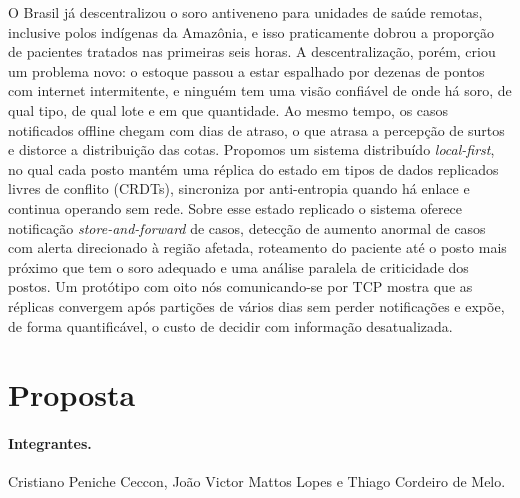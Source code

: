 \documentclass[a4paper,12pt]{article}
\begin{document}
\iniciarPreTextual
\fazcapa
\fazfolhaderosto

\begin{resumo}
  O Brasil já descentralizou o soro antiveneno para unidades de saúde
  remotas, inclusive polos indígenas da Amazônia, e isso praticamente dobrou
  a proporção de pacientes tratados nas primeiras seis horas. A
  descentralização, porém, criou um problema novo: o estoque passou a estar
  espalhado por dezenas de pontos com internet intermitente, e ninguém tem
  uma visão confiável de onde há soro, de qual tipo, de qual lote e em que
  quantidade. Ao mesmo tempo, os casos notificados offline chegam com dias de
  atraso, o que atrasa a percepção de surtos e distorce a distribuição das
  cotas. Propomos um sistema distribuído \emph{local-first}, no qual cada
  posto mantém uma réplica do estado em tipos de dados replicados livres de
  conflito (CRDTs), sincroniza por anti-entropia quando há enlace e continua
  operando sem rede. Sobre esse estado replicado o sistema oferece notificação
  \emph{store-and-forward} de casos, detecção de aumento anormal de casos com
  alerta direcionado à região afetada, roteamento do paciente até o posto mais
  próximo que tem o soro adequado e uma análise paralela de criticidade dos
  postos. Um protótipo com oito nós comunicando-se por TCP mostra que as
  réplicas convergem após partições de vários dias sem perder notificações e
  expõe, de forma quantificável, o custo de decidir com informação
  desatualizada.
\end{resumo}

\sumario

\iniciarTextual

\section{Proposta}
\label{sec:proposta}

\paragraph{Integrantes.} Cristiano Peniche Ceccon, João Victor Mattos Lopes e
Thiago Cordeiro de Melo.
\end{document}
